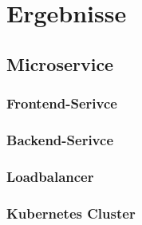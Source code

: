 \chapter{Ergebnisse}
\section{Microservice}
\subsection{Frontend-Serivce}
\subsection{Backend-Serivce}
\subsection{Loadbalancer}
\subsection{Kubernetes Cluster}
